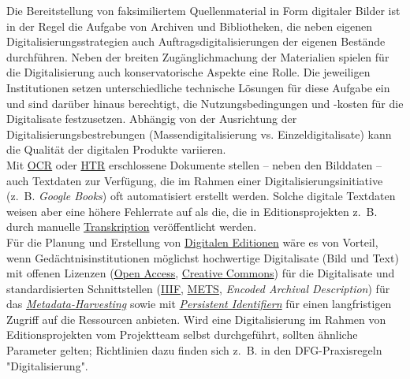 \documentclass{article}
\begin{document}
        Die Bereitstellung von faksimiliertem Quellenmaterial in Form digitaler Bilder ist
                  in der Regel die Aufgabe von Archiven und Bibliotheken, die neben eigenen
                  Digitalisierungsstrategien auch Auftragsdigitalisierungen der eigenen Bestände
                  durchführen. Neben der breiten Zugänglichmachung der Materialien spielen für die
                  Digitalisierung auch konservatorische Aspekte eine Rolle. Die jeweiligen
                  Institutionen setzen unterschiedliche technische Lösungen für diese Aufgabe ein
                  und sind darüber hinaus berechtigt, die Nutzungsbedingungen und -kosten für die
                  Digitalisate festzusetzen. Abhängig von der Ausrichtung der
                  Digitalisierungsbestrebungen (Massendigitalisierung vs. Einzeldigitalisate) kann
                  die Qualität der digitalen Produkte variieren. \\
            
        Mit \href{http://gams.uni-graz.at/o:konde.149}{OCR} oder \href{http://gams.uni-graz.at/o:konde.224}{HTR} erschlossene
                  Dokumente stellen – neben den Bilddaten – auch Textdaten zur Verfügung, die im
                  Rahmen einer Digitalisierungsinitiative (z. B. \emph{Google
                  Books}) oft automatisiert erstellt werden. Solche digitale Textdaten weisen
                  aber eine höhere Fehlerrate auf als die, die in Editionsprojekten z. B. durch
                  manuelle \href{http://gams.uni-graz.at/o:konde.197}{Transkription}
                  veröffentlicht werden.\\
            
        Für die Planung und Erstellung von \href{http://gams.uni-graz.at/o:konde.59}{Digitalen Editionen} wäre es von Vorteil, wenn Gedächtnisinstitutionen
                  möglichst hochwertige Digitalisate (Bild und Text) mit offenen Lizenzen (\href{http://gams.uni-graz.at/o:konde.152}{Open Access}, \href{http://gams.uni-graz.at/o:konde.45}{Creative Commons}) für die Digitalisate und
                  standardisierten Schnittstellen (\href{http://gams.uni-graz.at/o:konde.123}{IIIF}, \href{http://gams.uni-graz.at/o:konde.129}{METS}, \emph{Encoded Archival Description}) für das \emph{\href{http://gams.uni-graz.at/o:konde.10}{Metadata-Harvesting}} sowie mit \emph{\href{http://gams.uni-graz.at/o:konde.12}{Persistent Identifiern}} für einen langfristigen Zugriff auf die Ressourcen anbieten. Wird eine
                  Digitalisierung im Rahmen von Editionsprojekten vom Projektteam selbst
                  durchgeführt, sollten ähnliche Parameter gelten; Richtlinien dazu finden sich
                  z. B. in den DFG-Praxisregeln "Digitalisierung".\\
            
\end{document}
